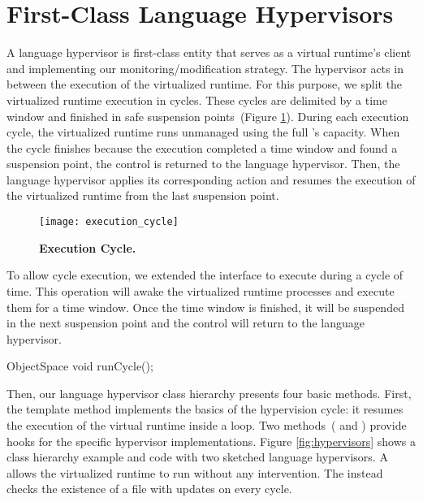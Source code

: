 
\section{First-Class Language Hypervisors}\label{sec:hypervisor}

A language hypervisor is first-class entity that serves as a virtual runtime's client and implementing our monitoring/modification strategy. The hypervisor acts in between the execution of the virtualized runtime. For this purpose, we split the virtualized runtime execution in cycles. These cycles are delimited by a time window and finished in safe suspension points~(Figure \ref{fig:execution_cycle}). During each execution cycle, the virtualized runtime runs unmanaged using the full \VM's capacity. When the cycle finishes because the execution completed a time window and found a suspension point, the control is returned to the language hypervisor. Then, the language hypervisor applies its corresponding action and resumes the execution of the virtualized runtime from the last suspension point.

\begin{figure}[ht]
\center
\texttt{[image: execution\_cycle]}
\caption{\textbf{Execution Cycle.} \label{fig:execution_cycle}}
\end{figure}

To allow cycle execution, we extended the  interface to execute during a cycle of time. This operation will awake the virtualized runtime processes and execute them for a time window. Once the time window is finished, it will be suspended in the next suspension point and the control will return to the language hypervisor.

\begin{code}
ObjectSpace {
    void runCycle();
}
\end{code}


Then, our language hypervisor class hierarchy presents four basic methods. First, the  template method implements the basics of the hypervision cycle: it resumes the execution of the virtual runtime inside a loop. Two methods~( and ) provide hooks for the specific hypervisor implementations. Figure \ref{fig:hypervisors} shows a class hierarchy example and code with two sketched language hypervisors. A  allows the virtualized runtime to run without any intervention. The  instead checks the existence of a file with updates on every cycle.

